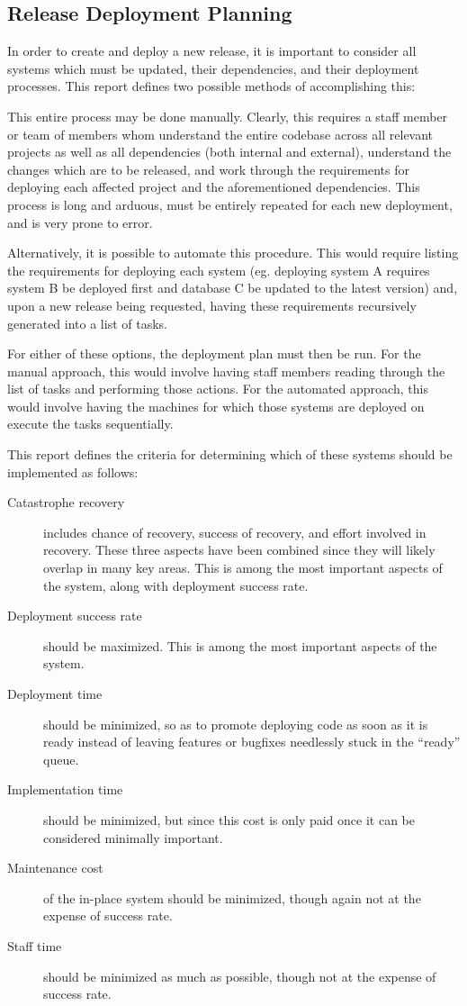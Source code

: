 \documentclass[12pt]{article}
\begin{document}
\subsection{Release Deployment Planning}
In order to create and deploy a new release, it is important to consider all systems which must be updated, their dependencies, and their deployment processes. This report defines two possible methods of accomplishing this:

This entire process may be done manually. Clearly, this requires a staff member or team of members whom understand the entire codebase across all relevant projects as well as all dependencies (both internal and external), understand the changes which are to be released, and work through the requirements for deploying each affected project and the aforementioned dependencies. This process is long and arduous, must be entirely repeated for each new deployment, and is very prone to error.

Alternatively, it is possible to automate this procedure. This would require listing the requirements for deploying each system (eg. deploying system A requires system B be deployed first and database C be updated to the latest version) and, upon a new release being requested, having these requirements recursively generated into a list of tasks.

For either of these options, the deployment plan must then be run. For the manual approach, this would involve having staff members reading through the list of tasks and performing those actions. For the automated approach, this would involve having the machines for which those systems are deployed on execute the tasks sequentially.

This report defines the criteria for determining which of these systems should be implemented as follows:
\begin{description}
\item[Catastrophe recovery] includes chance of recovery, success of recovery, and effort involved in recovery. These three aspects have been combined since they will likely overlap in many key areas. This is among the most important aspects of the system, along with deployment success rate.
\item[Deployment success rate] should be maximized. This is among the most important aspects of the system.
\item[Deployment time] should be minimized, so as to promote deploying code as soon as it is ready instead of leaving features or bugfixes needlessly stuck in the ``ready'' queue.
\item[Implementation time] should be minimized, but since this cost is only paid once it can be considered minimally important.
\item[Maintenance cost] of the in-place system should be minimized, though again not at the expense of success rate.
\item[Staff time] should be minimized as much as possible, though not at the expense of success rate.
\end{description}
\end{document}
